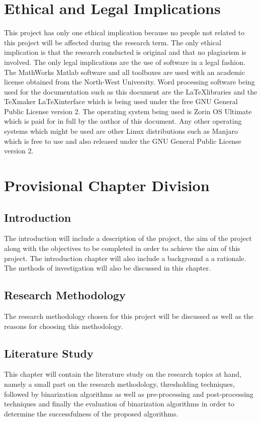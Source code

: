 \documentclass[11pt]{article}
\begin{document}
	\section{Ethical and Legal Implications}
		This project has only one ethical implication because no people not related to this project will be affected during the research term. The only ethical implication is that the research conducted is original and that no plagiarism is involved. The only legal implications are the use of software in a legal fashion. The MathWorks Matlab software and all toolboxes are used with an academic license obtained from the North-West University. Word processing software being used for the documentation such as this document are the \LaTeX \space libraries and the \TeX maker \LaTeX \space interface which is being used under the free GNU General Public License version 2. The operating system being used is Zorin OS Ultimate which is paid for in full by the author of this document. Any other operating systems which might be used are other Linux distributions such as Manjaro which is free to use and also released under the GNU General Public License version 2.

    \section{Provisional Chapter Division}
    	\subsection{Introduction}
    		The introduction will include a description of the project, the aim of the project along with the objectives to be completed in order to achieve the aim of this project. The introduction chapter will also include a background a a rationale. The methods of investigation will also be discussed in this chapter.

    	\subsection{Research Methodology}
    		The research methodology chosen for this project will be discussed as well as the reasons for choosing this methodology.

    	\subsection{Literature Study}
    		This chapter will contain the literature study on the research topics at hand, namely a small part on the research methodology, thresholding techniques, followed by binarization algorithms as well as pre-processing and post-processing techniques and finally the evaluation of binarization algorithms in order to determine the successfulness of the proposed algorithms.
\end{document}
